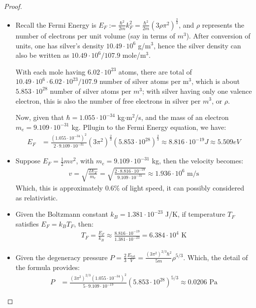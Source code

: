 \documentclass{article}
\begin{document}
\begin{proof}

    \hfil

    \begin{itemize}
        \item[(a)] Recall the Fermi Energy is $E_F := \frac{\hbar^2}{2m}k_F^2= \frac{\hbar^2}{2m}(3\rho \pi^2)^\frac{2}{3}$, and $\rho$ represents the number of electrons per unit volume (say in terms of $m^3$). After conversion of units, one has silver's density $10.49\cdot 10^6$ g/m$^3$, hence the silver density can also be written as $10.49\cdot 10^6/107.9$ mole/m$^3$.
        
        With each mole having $6.02\cdot 10^{23}$ atoms, there are total of $10.49\cdot 10^6\cdot 6.02\cdot 10^{23}/107.9$ number of silver atoms per m$^3$, which is about $5.853\cdot 10^{28}$ number of silver atoms per $m^3$; with silver having only one valence electron, this is also the number of free electrons in silver per $m^3$, or $\rho$.

        Now, given that $\hbar = 1.055\cdot 10^{-34}$ kg$\cdot$m$^2$/s, and the mass of an electron $m_e = 9.109\cdot 10^{-31}$ kg. Pllugin to the Fermi Energy equation, we have:
        \begin{align}
            E_F &= \frac{(1.055\cdot 10^{-34})^2}{2\cdot 9.109\cdot 10^{-31}}(3\pi^2)^\frac{2}{3}(5.853\cdot 10^{28})^\frac{2}{3}\approx 8.816\cdot 10^{-19} J\approx 5.509 eV
        \end{align}

        \hfil

        \item[(b)] Suppose $E_F = \frac{1}{2}mv^2$, with $m_e = 9.109\cdot 10^{-31}$ kg, then the velocity becomes:
        \begin{align}
            v = \sqrt{\frac{2E_F}{m_e}} = \sqrt{\frac{2\cdot 8.816\cdot 10^{-19}}{9.109\cdot 10^{-31}}}\approx 1.936\cdot 10^6 \text{ m/s}
        \end{align}
        Which, this is approximately $0.6\%$ of light speed, it can possibly considered as relativistic.

        \hfil

        \item[(c)] Given the Boltzmann constant $k_B = 1.381\cdot 10^{-23}$ J/K, if temperature $T_F$ satisfies $E_F = k_B T_F$, then:
        \begin{align}
            T_F = \frac{E_F}{k_B} \approx \frac{8.816\cdot 10^{-19}}{1.381\cdot 10^{-23}} = 6.384\cdot 10^4 \text{ K}
        \end{align}

        \hfil

        \item[(d)] Given the degeneracy pressure $P = \frac{2}{3}\frac{E_\text{tot}}{V} = \frac{(3\pi^2)^{2/3}\hbar^2}{5m}\rho^{5/3}$. Which, the detail of the formula provides:
        \begin{align}
            P &= \frac{(3\pi^2)^{2/3}(1.055\cdot 10^{-34})^2}{5\cdot 9.109\cdot 10^{-19}}(5.853\cdot 10^{28})^{5/3} \approx 0.0206 \text{ Pa}
        \end{align}
    \end{itemize}
\end{proof}
\end{document}
